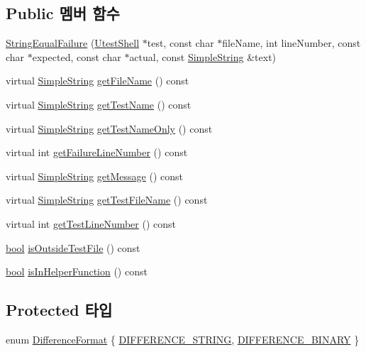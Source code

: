 \subsection*{Public 멤버 함수}
\begin{DoxyCompactItemize}
\item 
\hyperlink{class_string_equal_failure_a0f71f0a2febd1257a8ee92033dbdfd49}{String\+Equal\+Failure} (\hyperlink{class_utest_shell}{Utest\+Shell} $\ast$test, const char $\ast$file\+Name, int line\+Number, const char $\ast$expected, const char $\ast$actual, const \hyperlink{class_simple_string}{Simple\+String} \&text)
\item 
virtual \hyperlink{class_simple_string}{Simple\+String} \hyperlink{class_test_failure_ac74fa65c497d9a175304a14ffafcaa1a}{get\+File\+Name} () const 
\item 
virtual \hyperlink{class_simple_string}{Simple\+String} \hyperlink{class_test_failure_a02da3865d8c38e5fd122a08a5e23773e}{get\+Test\+Name} () const 
\item 
virtual \hyperlink{class_simple_string}{Simple\+String} \hyperlink{class_test_failure_ac5e7fcbcf3831504c42ee41691b0a7e7}{get\+Test\+Name\+Only} () const 
\item 
virtual int \hyperlink{class_test_failure_a9d41f8ad9667ed1f471676d49a655ec7}{get\+Failure\+Line\+Number} () const 
\item 
virtual \hyperlink{class_simple_string}{Simple\+String} \hyperlink{class_test_failure_a55ca73e984d01e477b9cc990acf7dffd}{get\+Message} () const 
\item 
virtual \hyperlink{class_simple_string}{Simple\+String} \hyperlink{class_test_failure_a2fb8d164bb0730492e0140ec8080f13f}{get\+Test\+File\+Name} () const 
\item 
virtual int \hyperlink{class_test_failure_a9fd9b831dfada83bbc2a1847918080a6}{get\+Test\+Line\+Number} () const 
\item 
\hyperlink{avb__gptp_8h_af6a258d8f3ee5206d682d799316314b1}{bool} \hyperlink{class_test_failure_a977b24b749f7dc0d279fed902991c7b4}{is\+Outside\+Test\+File} () const 
\item 
\hyperlink{avb__gptp_8h_af6a258d8f3ee5206d682d799316314b1}{bool} \hyperlink{class_test_failure_a8658daf09d68f724672ed9c7b1d94e95}{is\+In\+Helper\+Function} () const 
\end{DoxyCompactItemize}
\subsection*{Protected 타입}
\begin{DoxyCompactItemize}
\item 
enum \hyperlink{class_test_failure_aaadecd271c82449768993cbf919de0a2}{Difference\+Format} \{ \hyperlink{class_test_failure_aaadecd271c82449768993cbf919de0a2a1246a1a469970104212c9113e3f057c9}{D\+I\+F\+F\+E\+R\+E\+N\+C\+E\+\_\+\+S\+T\+R\+I\+NG}, 
\hyperlink{class_test_failure_aaadecd271c82449768993cbf919de0a2af76cc43dfdf0618b3cb16196894d5929}{D\+I\+F\+F\+E\+R\+E\+N\+C\+E\+\_\+\+B\+I\+N\+A\+RY}
 \}
\end{DoxyCompactItemize}
